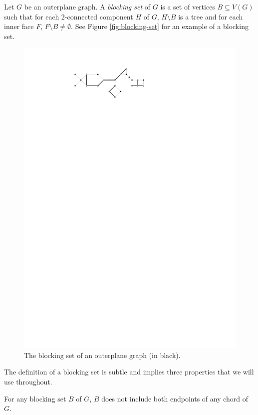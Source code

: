 \documentclass{patmorin}
\begin{document}
Let $G$ be an outerplane graph. A \emph{blocking set} of $G$ is a set
of vertices $B \subseteq V(G)$ such that for each 2-connected component
$H$ of $G$, $H \setminus B$ is a tree and for each inner face $F$,
$F \setminus B \not= \emptyset$.  See Figure \ref{fig:blocking-set}
for an example of a blocking set.

\begin{figure}
  \begin{center}
     \includegraphics{figs/blocking-set-1}
  \end{center}
  \caption{The blocking set of an outerplane graph (in black).}
\end{figure}

The definition of a blocking set is subtle and implies three properties
that we will use throughout.   

\begin{obs}
   For any blocking set $B$ of $G$, $B$ does not include both endpoints
   of any chord of $G$.
\end{obs}
\end{document}
